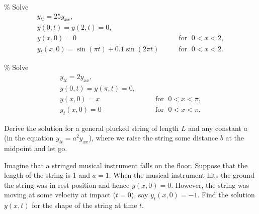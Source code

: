 \documentclass{ximera}
\begin{document}
\begin{exercise}\%
    Solve
    \begin{equation*}
    \begin{array}{ll}
        y_{tt} = 25 y_{xx} , &  \\
        y(0,t) = y(2,t) = 0 , &  \\
        y(x,0) = 0 & \qquad \text{for } \; 0 < x < 2 , \\
        y_t(x,0) = \sin(\pi t) + 0.1 \sin(2\pi t) & \qquad \text{for } \; 0 < x < 2 .
    \end{array}
    \end{equation*}
\end{exercise}

\begin{exercise}\%
    Solve
    \begin{equation*}
    \begin{array}{ll}
        y_{tt} = 2 y_{xx} , &  \\
        y(0,t) = y(\pi,t) = 0 , &  \\
        y(x,0) = x & \qquad \text{for } \; 0 < x < \pi , \\
        y_t(x,0) = 0 & \qquad \text{for } \; 0 < x < \pi .
    \end{array}
    \end{equation*}
\end{exercise}

\begin{exercise}
    Derive the solution for a general plucked string of length $L$ and any constant $a$ (in the equation $y_{tt} = a^2 y_{xx}$), where we raise the string some distance $b$ at the midpoint and let go.
\end{exercise}


\begin{exercise}
    Imagine that a stringed musical instrument falls on the floor.  Suppose that the length of the string is 1 and $a=1$.  When the musical instrument hits the ground the string was in rest position and hence $y(x,0) = 0$.  However, the string was moving at some velocity at impact ($t=0$), say $y_t(x,0) = -1$.  Find the solution $y(x,t)$ for the shape of the string at time $t$.
\end{exercise}
\end{document}
